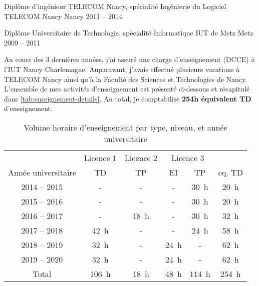\documentclass[12pt, a4paper]{awesome-cv}
\begin{document}

\begin{cventries}

\cventry
    {Diplôme d'ingénieur TELECOM Nancy, spécialité Ingénierie du Logiciel} %
    {TELECOM Nancy} %
    {Nancy} %
    {2011 – 2014} %
    {}

\cventry
  {Diplôme Universitaire de Technologie, spécialité Informatique} %
  {IUT de Metz} %
  {Metz} %
  {2009 – 2011} %
  {}
\end{cventries}



\begin{cvparagraph}
  Au cours des 3 dernières années, j'ai assuré une charge d'enseignement (DCCE) à l'IUT Nancy Charlemagne.
  Auparavant, j'avais effectué plusieurs vacations à TELECOM Nancy ainsi qu'à la Faculté des Sciences et Technologies de Nancy.
  L'ensemble de mes activités d'enseignement est présenté ci-dessous et récapitulé dans \autoref{tab:enseignement-details}.
  Au total, je comptabilise \textbf{254h équivalent TD} d'enseignement.
\end{cvparagraph}

\begin{table}[ht]
  \centering
  \begin{tabular}{ c | c | c | c c | c }
    & Licence 1 & Licence 2 & \multicolumn{2}{c|}{Licence 3} \\
    Année universitaire & TD & TP & EI & TP & eq. TD  \\
    \hline
    2014 -- 2015 & - & - & - & 30~h & 20~h\\
    2015 -- 2016 & - & - & - & 30~h & 20~h\\
    2016 -- 2017 & - & 18~h & - & 30~h & 32~h\\
    2017 -- 2018 & 42~h & - & - & 24~h & 58~h\\
    2018 -- 2019 & 32~h & - & 24~h & - & 62~h\\
    2019 -- 2020 & 32~h & - & 24~h & - & 62~h\\
    \hline
    Total  & 106~h & 18~h & 48~h & 114~h & 254~h\\
  \end{tabular}
  \caption{Volume horaire d'enseignement par type, niveau, et année universitaire}\label{tab:enseignement-details}
\end{table}
\end{document}
